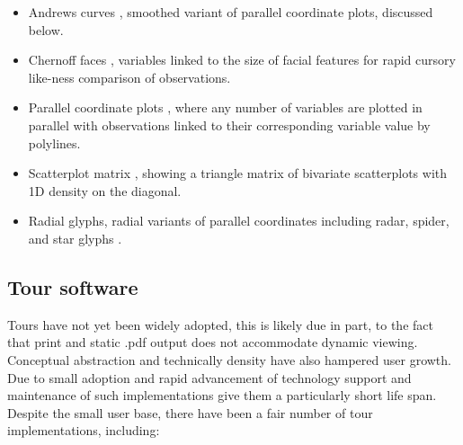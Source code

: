 \documentclass{monashthesis}
\begin{document}
\begin{itemize}
  \begin{itemize}
  \tightlist
  \item
    Andrews curves \autocite{andrews_plots_1972}, smoothed variant of
    parallel coordinate plots, discussed below.
  \item
    Chernoff faces \autocite{chernoff_use_1973}, variables linked to the
    size of facial features for rapid cursory like-ness comparison of
    observations.
  \item
    Parallel coordinate plots \autocite{ocagne_coordonnees_1885}, where
    any number of variables are plotted in parallel with observations
    linked to their corresponding variable value by polylines.
  \item
    Scatterplot matrix \autocite{becker_brushing_1987}, showing a
    triangle matrix of bivariate scatterplots with 1D density on the
    diagonal.
  \item
    Radial glyphs, radial variants of parallel coordinates including
    radar, spider, and star glyphs \autocite{siegel_surgical_1972}.
  \end{itemize}
\end{itemize}

\subsection{Tour software}\label{tour-software}

Tours have not yet been widely adopted, this is likely due in part, to
the fact that print and static .pdf output does not accommodate dynamic
viewing. Conceptual abstraction and technically density have also
hampered user growth. Due to small adoption and rapid advancement of
technology support and maintenance of such implementations give them a
particularly short life span. Despite the small user base, there have
been a fair number of tour implementations, including:
\end{document}
